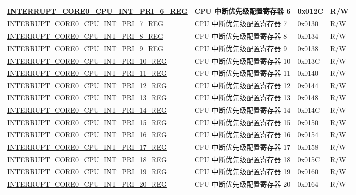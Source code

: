 \begin{longtable}{ | p{10cm} | m{10cm} | m{1.3cm} | m{1.0cm} | }
\hyperref[regdesc:INTERRUPTCORE0CPUINTPRI0REG]{INTERRUPT\_CORE0\_CPU\_INT\_PRI\_6\_REG} & CPU 中断优先级配置寄存器 6 & 0x012C & R/W \\ \hline
\hyperref[regdesc:INTERRUPTCORE0CPUINTPRI0REG]{INTERRUPT\_CORE0\_CPU\_INT\_PRI\_7\_REG} & CPU 中断优先级配置寄存器 7 & 0x0130 & R/W \\ \hline
\hyperref[regdesc:INTERRUPTCORE0CPUINTPRI0REG]{INTERRUPT\_CORE0\_CPU\_INT\_PRI\_8\_REG} & CPU 中断优先级配置寄存器 8 & 0x0134 & R/W \\ \hline
\hyperref[regdesc:INTERRUPTCORE0CPUINTPRI0REG]{INTERRUPT\_CORE0\_CPU\_INT\_PRI\_9\_REG} & CPU 中断优先级配置寄存器 9 & 0x0138 & R/W \\ \hline
\hyperref[regdesc:INTERRUPTCORE0CPUINTPRI0REG]{INTERRUPT\_CORE0\_CPU\_INT\_PRI\_10\_REG} & CPU 中断优先级配置寄存器 10 & 0x013C & R/W \\ \hline
\hyperref[regdesc:INTERRUPTCORE0CPUINTPRI0REG]{INTERRUPT\_CORE0\_CPU\_INT\_PRI\_11\_REG} & CPU 中断优先级配置寄存器 11 & 0x0140 & R/W \\ \hline
\hyperref[regdesc:INTERRUPTCORE0CPUINTPRI0REG]{INTERRUPT\_CORE0\_CPU\_INT\_PRI\_12\_REG} & CPU 中断优先级配置寄存器 12 & 0x0144 & R/W \\ \hline
\hyperref[regdesc:INTERRUPTCORE0CPUINTPRI0REG]{INTERRUPT\_CORE0\_CPU\_INT\_PRI\_13\_REG} & CPU 中断优先级配置寄存器 13 & 0x0148 & R/W \\ \hline
\hyperref[regdesc:INTERRUPTCORE0CPUINTPRI0REG]{INTERRUPT\_CORE0\_CPU\_INT\_PRI\_14\_REG} & CPU 中断优先级配置寄存器 14 & 0x014C & R/W \\ \hline
\hyperref[regdesc:INTERRUPTCORE0CPUINTPRI0REG]{INTERRUPT\_CORE0\_CPU\_INT\_PRI\_15\_REG} & CPU 中断优先级配置寄存器 15 & 0x0150 & R/W \\ \hline
\hyperref[regdesc:INTERRUPTCORE0CPUINTPRI0REG]{INTERRUPT\_CORE0\_CPU\_INT\_PRI\_16\_REG} & CPU 中断优先级配置寄存器 16 & 0x0154 & R/W \\ \hline
\hyperref[regdesc:INTERRUPTCORE0CPUINTPRI0REG]{INTERRUPT\_CORE0\_CPU\_INT\_PRI\_17\_REG} & CPU 中断优先级配置寄存器 17 & 0x0158 & R/W \\ \hline
\hyperref[regdesc:INTERRUPTCORE0CPUINTPRI0REG]{INTERRUPT\_CORE0\_CPU\_INT\_PRI\_18\_REG} & CPU 中断优先级配置寄存器 18 & 0x015C & R/W \\ \hline
\hyperref[regdesc:INTERRUPTCORE0CPUINTPRI0REG]{INTERRUPT\_CORE0\_CPU\_INT\_PRI\_19\_REG} & CPU 中断优先级配置寄存器 19 & 0x0160 & R/W \\ \hline
\hyperref[regdesc:INTERRUPTCORE0CPUINTPRI0REG]{INTERRUPT\_CORE0\_CPU\_INT\_PRI\_20\_REG} & CPU 中断优先级配置寄存器 20 & 0x0164 & R/W \\ \hline

\end{longtable}
